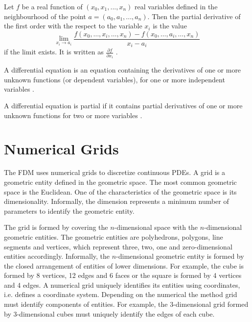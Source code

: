 \begin{definition}
 Let \(f\) be a real function of \((x_0, x_1, ... , x_n)\) real variables defined in the neighbourhood of the point \(a = (a_0, a_1, ... , a_n)\).
 Then the partial derivative of the first order with the respect to the variable \(x_i\) is the value
 \begin{equation}
 \lim_{x_i \to a_i} \frac{f(x_0, \dots , x_i, \dots, x_n) - f(x_0, \dots , a_i, \dots, x_n)}{x_i - a_i}
 \end{equation}
 if the limit exists. It is written as \(\frac{\partial f}{\partial x_i}\) \cite{PartialDerivative}.
\end{definition}

\newpage

\begin{definition}
 A differential equation is an equation containing the derivatives of one or more unknown functions (or dependent variables), for one or more independent variables \cite{zill2012first}.
\end{definition}

\begin{definition}
 A differential equation is partial if it contains partial derivatives of one or more unknown functions for two or more variables \cite{zill2012first}.
\end{definition}

\section{Numerical Grids}

The FDM uses numerical grids to discretize continuous PDEs.
A grid is a geometric entity defined in the geometric space.
The most common geometric space is the Euclidean.
One of the characteristics of the geometric space is its dimensionality.
Informally, the dimension represents a minimum number of parameters to identify the geometric entity.

The grid is formed by covering the \(n\)-dimensional space with the \(n\)-dimensional geometric entities.
The geometric entities are polyhedrons, polygons, line segments and vertices, which represent three, two, one and zero-dimensional entities accordingly.
Informally, the \(n\)-dimensional geometric entity is formed by the closed arrangement of entities of lower dimensions.
For example, the cube is formed by 8 vertices, 12 edges and 6 faces or the square is formed by 4 vertices and 4 edges.
A numerical grid uniquely identifies its entities using coordinates, i.e. defines a coordinate system.
Depending on the numerical the method grid must identify components of entities.
For example, the 3-dimensional grid formed by 3-dimensional cubes must uniquely identify the edges of each cube.

